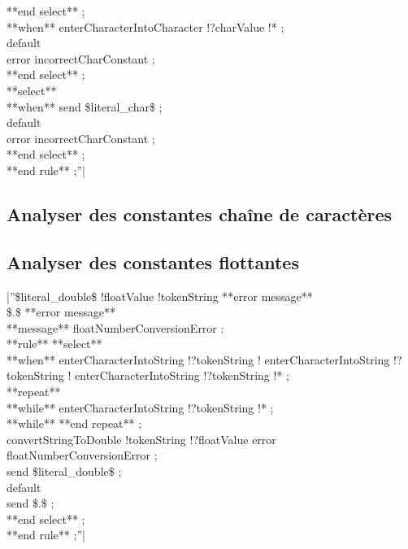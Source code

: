   **end select** ;\\
 **when** %
  enterCharacterIntoCharacter !?charValue !* ;\\
 default\\
  error incorrectCharConstant ;\\
 **end select** ;\\
 **select**\\
 **when** %
  send \$literal\_char\$ ;\\
 default\\
  error incorrectCharConstant ;\\
 **end select** ;\\
**end rule** ;''|

\subsection{Analyser des constantes chaîne de caractères}

\subsection{Analyser des constantes flottantes}

|''\$literal\_double\$ !floatValue !tokenString **error message** %
\\
\$.\$ **error message** %
\\
**message** floatNumberConversionError : %
\\
**rule** %
 **select**\\
 **when** %
  enterCharacterIntoString !?tokenString !%
  enterCharacterIntoString !?tokenString !%
  enterCharacterIntoString !?tokenString !* ;\\
  **repeat**\\
  **while** %
   enterCharacterIntoString !?tokenString !* ;\\
  **while** %
  **end repeat** ;\\
  convertStringToDouble !tokenString !?floatValue error floatNumberConversionError ;\\
  send \$literal\_double\$ ;\\
 default\\
  send \$.\$ ;\\
 **end select** ;\\
**end rule** ;''|

